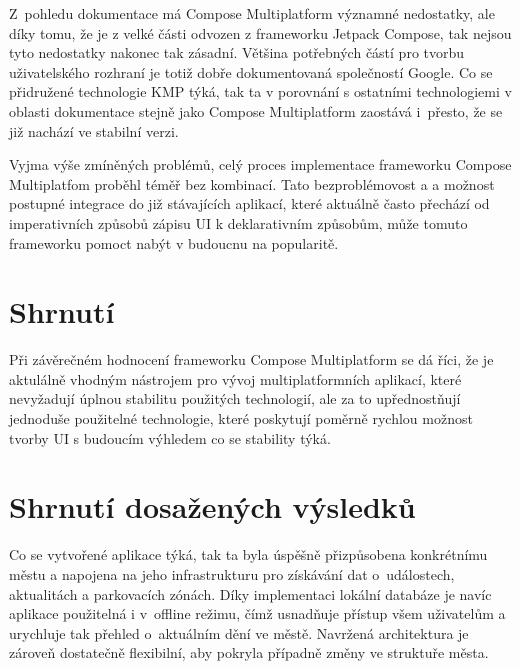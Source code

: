 

Z~pohledu dokumentace má Compose Multiplatform významné nedostatky, ale díky tomu, že je z velké části odvozen z frameworku Jetpack Compose,
tak nejsou tyto nedostatky nakonec tak zásadní. Většina potřebných částí pro tvorbu uživatelského rozhraní je totiž dobře dokumentovaná 
společností Google. Co se přidružené technologie KMP týká, tak ta v porovnání s ostatními technologiemi v oblasti dokumentace stejně jako Compose 
Multiplatform zaostává i~přesto, že se již nachází ve stabilní verzi.

Vyjma výše zmíněných problémů, celý proces implementace frameworku Compose Multiplatfom proběhl téměř bez kombinací. Tato bezproblémovost a 
a možnost postupné integrace do již stávajících aplikací, které aktuálně často přechází od imperativních způsobů zápisu UI k deklarativním způsobům,
může tomuto frameworku pomoct nabýt v budoucnu na popularitě. 

\section*{Shrnutí}
Při závěrečném hodnocení frameworku Compose Multiplatform se dá říci, že je aktulálně vhodným nástrojem pro vývoj multiplatformních 
aplikací, které nevyžadují úplnou stabilitu použitých technologií, ale za to upřednostňují jednoduše použitelné technologie, které 
poskytují poměrně rychlou možnost tvorby UI s budoucím výhledem co se stability týká.


\section{Shrnutí dosažených výsledků}
Co se vytvořené aplikace týká, tak ta byla úspěšně přizpůsobena konkrétnímu městu a napojena na jeho infrastrukturu pro získávání dat 
o~událostech, aktualitách a parkovacích zónách. Díky implementaci lokální databáze je navíc aplikace použitelná i v~offline režimu, čímž 
usnadňuje přístup všem uživatelům a urychluje tak přehled o~aktuálním dění ve městě. Navržená architektura je zároveň dostatečně flexibilní, 
aby pokryla případně změny ve struktuře města.

